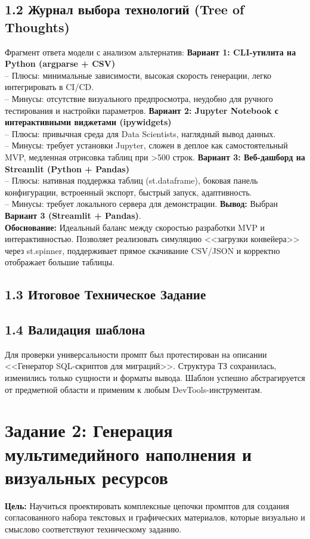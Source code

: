 \documentclass[oneside,a4paper,14pt]{extarticle}
\begin{document}
	\subsection*{1.2 Журнал выбора технологий (Tree of Thoughts)}
	\noindent
	Фрагмент ответа модели с анализом альтернатив:
	\noindent
	\textbf{Вариант 1: CLI-утилита на Python (argparse + CSV)}\\
	-- Плюсы: минимальные зависимости, высокая скорость генерации, легко интегрировать в CI/CD.\\
	-- Минусы: отсутствие визуального предпросмотра, неудобно для ручного тестирования и настройки параметров.
	\noindent
	\textbf{Вариант 2: Jupyter Notebook с интерактивными виджетами (ipywidgets)}\\
	-- Плюсы: привычная среда для Data Scientists, наглядный вывод данных.\\
	-- Минусы: требует установки Jupyter, сложен в деплое как самостоятельный MVP, медленная отрисовка таблиц при >500 строк.
	\noindent
	\textbf{Вариант 3: Веб-дашборд на Streamlit (Python + Pandas)}\\
	-- Плюсы: нативная поддержка таблиц (st.dataframe), боковая панель конфигурации, встроенный экспорт, быстрый запуск, адаптивность.\\
	-- Минусы: требует локального сервера для демонстрации.
	\noindent
	\textbf{Вывод:} Выбран \textbf{Вариант 3 (Streamlit + Pandas)}.\\
	\textbf{Обоснование:} Идеальный баланс между скоростью разработки MVP и интерактивностью. Позволяет реализовать симуляцию <<загрузки конвейера>> через st.spinner, поддерживает прямое скачивание CSV/JSON и корректно отображает большие таблицы.
	\newpage
	\subsection*{1.3 Итоговое Техническое Задание}
	
	\subsection*{1.4 Валидация шаблона}
	\noindent
	Для проверки универсальности промпт был протестирован на описании <<Генератор SQL-скриптов для миграций>>. Структура ТЗ сохранилась, изменились только сущности и форматы вывода. Шаблон успешно абстрагируется от предметной области и применим к любым DevTools-инструментам.
	\newpage
	\section*{Задание 2: Генерация мультимедийного наполнения и визуальных ресурсов}
	\noindent
	\textbf{Цель:} Научиться проектировать комплексные цепочки промптов для создания согласованного набора текстовых и графических материалов, которые визуально и смыслово соответствуют техническому заданию.
\end{document}
